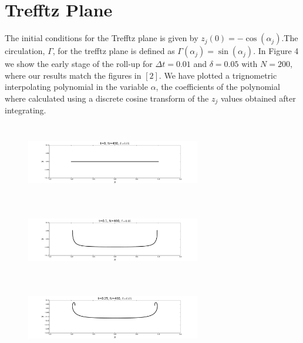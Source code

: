 \documentclass[12pt,twoside]{article}
\begin{document}
\section{Trefftz Plane}
The initial conditions for the Trefftz plane is given by $z_j(0)=-\cos(\alpha_j)$.The circulation, $\Gamma$, for the trefftz plane is defined as $\Gamma(\alpha_j)=\sin(\alpha_j)$. In Figure 4 we show the early stage of the roll-up for $\Delta t=0.01$ and $\delta=0.05$ with $N=200$, where our results match the figures in $[2]$. We have plotted a trignometric interpolating polynomial in the variable $\alpha$, the coefficients of the polynomial where calculated using a discrete cosine transform of the $z_j$ values obtained after integrating. 
\begin{figure}
\begin{center}
	\includegraphics[width=3in,height=1.33in]{tr1.pdf} 
	\includegraphics[width=3in,height=1.33in]{tr2.pdf}
	\includegraphics[width=3in,height=1.33in]{tr3.pdf}


\end{center}
\end{figure}
\end{document}
